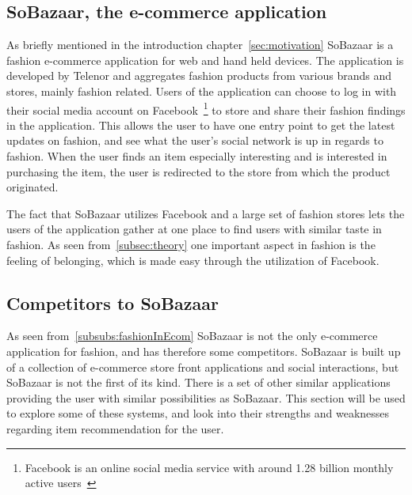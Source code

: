 \subsection{SoBazaar, the e-commerce application}
  As briefly mentioned in the introduction chapter~\ref{sec:motivation} SoBazaar is a fashion e-commerce application for web and hand held devices.
  The application is developed by Telenor and aggregates fashion products from various brands and stores, mainly fashion related.
  Users of the application can choose to log in with their social media account on Facebook~\footnote{Facebook is an online social media service with around 1.28 billion monthly active users~\cite{facebook}} to store and share their fashion findings in the application.
  This allows the user to have one entry point to get the latest updates on fashion, and see what the user's social network is up in regards to fashion.
  When the user finds an item especially interesting and is interested in purchasing the item, the user is redirected to the store from which the product originated.

  The fact that SoBazaar utilizes Facebook and a large set of fashion stores lets the users of the application gather at one place to find users with similar taste in fashion.
  As seen from~\ref{subsec:theory} one important aspect in fashion is the feeling of belonging, which is made easy through the utilization of Facebook.

\subsection{Competitors to SoBazaar}
  \label{subsec:competitors}


    As seen from~\ref{subsubs:fashionInEcom} SoBazaar is not the only e-commerce application for fashion, and has therefore some competitors.
    SoBazaar is built up of a collection of e-commerce store front applications and social interactions, but SoBazaar is not the first of its kind.
    There is a set of other similar applications providing the user with similar possibilities as SoBazaar.
    This section will be used to explore some of these systems, and look into their strengths and weaknesses regarding item recommendation for the user.

